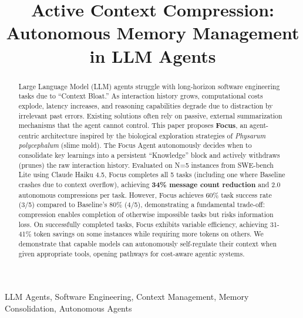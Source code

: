 \documentclass[conference]{IEEEtran}
\begin{document}
\title{Active Context Compression: Autonomous Memory Management in LLM Agents}

\author{
}

\maketitle

\begin{abstract}
Large Language Model (LLM) agents struggle with long-horizon software engineering tasks due to ``Context Bloat.'' As interaction history grows, computational costs explode, latency increases, and reasoning capabilities degrade due to distraction by irrelevant past errors. Existing solutions often rely on passive, external summarization mechanisms that the agent cannot control. This paper proposes \textbf{Focus}, an agent-centric architecture inspired by the biological exploration strategies of \textit{Physarum polycephalum} (slime mold). The Focus Agent autonomously decides when to consolidate key learnings into a persistent ``Knowledge'' block and actively withdraws (prunes) the raw interaction history. Evaluated on N=5 instances from SWE-bench Lite using Claude Haiku 4.5, Focus completes all 5 tasks (including one where Baseline crashes due to context overflow), achieving \textbf{34\% message count reduction} and 2.0 autonomous compressions per task. However, Focus achieves 60\% task success rate (3/5) compared to Baseline's 80\% (4/5), demonstrating a fundamental trade-off: compression enables completion of otherwise impossible tasks but risks information loss. On successfully completed tasks, Focus exhibits variable efficiency, achieving 31-41\% token savings on some instances while requiring more tokens on others. We demonstrate that capable models can autonomously self-regulate their context when given appropriate tools, opening pathways for cost-aware agentic systems.
\end{abstract}

\begin{IEEEkeywords}
LLM Agents, Software Engineering, Context Management, Memory Consolidation, Autonomous Agents
\end{IEEEkeywords}
\end{document}
